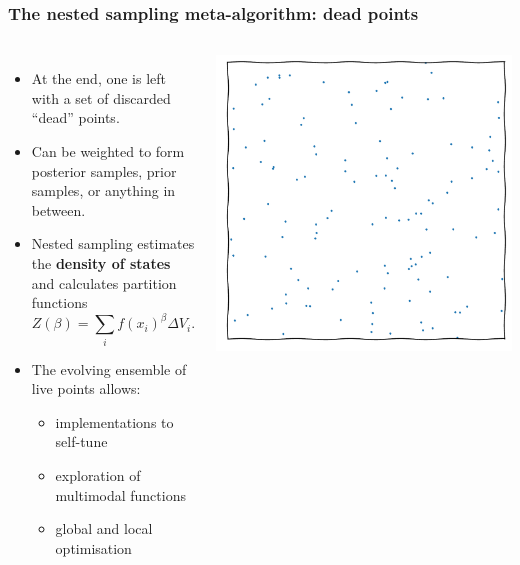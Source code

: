 \documentclass[aspectratio=169]{beamer}
\begin{document}
\begin{frame}
    \frametitle{The nested sampling meta-algorithm: dead points}
    \begin{columns}
        \begin{itemize}
            \item At the end, one is left with a set of discarded ``dead'' points.
            \item Can be weighted to form posterior samples, prior samples, or anything in between.
            \item Nested sampling estimates the \textbf{density of states} and calculates partition functions
                \[Z(\beta) = \sum_i f(x_i)^\beta \Delta V_i.\]
            \item The evolving ensemble of live points allows:
                \begin{itemize}
                    \item implementations to self-tune
                    \item exploration of multimodal functions
                    \item global and local optimisation
                \end{itemize}
        \end{itemize}
        \includegraphics[width=\textwidth,page=14]{figures/himmelblau}%

\end{columns}
\end{frame}
\end{document}
